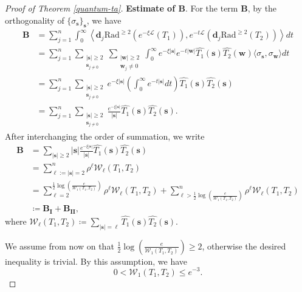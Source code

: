 \documentclass{amsbook}
\theoremstyle{definition}
\theoremstyle{remark}
\numberwithin{section}{chapter}
\numberwithin{equation}{chapter}
\newcommand{\1}{\mathbf{1}}
\newcommand{\s}{\mathbf{s}}
\newcommand{\La}{\mathcal{L}}
\newcommand{\dc}{\mathbf{d}}
\begin{document}
\begin{proof}[Proof of Theorem \ref{quantum-ta}]
	
	{\bf Estimate of $\mathbf{B}$}. For the term $\mathbf{B}$, by the orthogonality of \(\{\sigma_{\s}\}_{\s}\), we have
\begin{align*}
\mathbf{B}&=\sum_{j=1}^{n}\int_{0}^{\infty}\left\langle\dc_{j}\mathrm{Rad}^{\geq 2}\left(e^{-\xi\La}(T_1)\right),e^{-t\La}\left(\dc_{j}\mathrm{Rad}^{\geq 2}(T_2)\right)\right\rangle dt\\
			&=\sum_{j=1}^{n}\sum_{\substack{|\s|\geq 2\\\s_{j\neq 0}}}\sum_{\substack{|\mathbf{w}|\geq 2\\\mathbf w_{j}\neq 0}}\int_{0}^{\infty}e^{-\xi|\s|}e^{-t|\mathbf{w}|}\widehat{T_1}(\s)\widehat{T_2}(\mathbf{w})\langle\sigma_{\s},\sigma_{\mathbf{w}}\rangle dt\\
			&=\sum_{j=1}^{n}\sum_{\substack{|\s|\geq 2\\\s_{j\neq 0}}}e^{-\xi|\s|}\left(\int_{0}^{\infty}e^{-t|\s|}dt\right)\widehat{T_1}(\s)\widehat{T_2}(\s)\\
&=\sum_{j=1}^{n}\sum_{\substack{|\s|\geq 2\\\s_{j\neq 0}}}\frac{e^{-\xi|\s|}}{|\s|}\widehat{T_1}(\s)\widehat{T_2}(\s).
\end{align*}
 After interchanging the order of summation, we write
	\begin{equation}\label{split-term-1}
		\begin{split}
\mathbf{B}
        &=\sum_{|\s|\geq 2}|\s|\frac{e^{-\xi|\s|}}{|\s|}\widehat{T_1}(\s)\widehat{T_2}(\s)\\
			&=\sum_{\ell:=|\s|=2}^{n}\rho^{\ell}\mathcal{W}_{\ell}(T_1,T_2)\\
			&=\sum_{\ell=2}^{\frac 12\log\left(\frac{e}{\mathcal{W}_{1}(T_1,T_2)}\right)}\rho^{\ell}\mathcal{W}_{\ell}(T_1,T_2)+\sum_{\ell>\frac 12\log\left(\frac{e}{\mathcal{W}_{1}(T_1,T_2)}\right)}^{n}\rho^{\ell}\mathcal{W}_{\ell}(T_1,T_2)\\
			&\coloneqq \mathbf{B_{I}}+\mathbf{B_{II}},
		\end{split}
	\end{equation}
	where $\mathcal{W}_{\ell}(T_1,T_2)\coloneqq \sum_{|\s|=\ell}\widehat{T_1}(\s)\widehat{T_2}(\s)$.
	
	We  assume from now on that $\frac{1}{2}\log\left(\frac{e}{\mathcal{W}_{1}(T_1,T_2)}\right)\geq 2$, otherwise the desired inequality is trivial. By this assumption, we have
	\begin{equation}\label{upper-bound-to-main-1}
		0<\mathcal{W}_{1}(T_1,T_2)\leq e^{-3}.
	\end{equation}
	

\end{proof}
\end{document}
